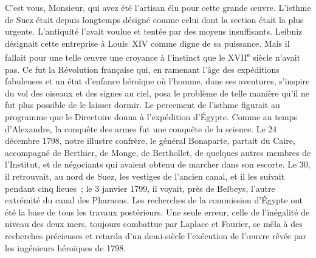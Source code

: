 \documentclass[french,twoside]{book} %
\newcommand\orgName[1]{#1}
\newcommand\persName[1]{#1}
\newcommand\placeName[1]{#1}
\begin{document}
C’est vous, Monsieur, qui avez été l’artisan élu pour cette grande œuvre. L’{\placeName isthme de Suez} était depuis longtemps désigné comme celui dont la section était la plus urgente. L’antiquité l’avait voulue et tentée par des moyens insuffisants. {\persName Leibniz} désignait cette entreprise à {\persName Louis XIV} comme digne de sa puissance. Mais il fallait pour une telle œuvre une croyance à l’instinct que le XVII\textsuperscript{e} siècle n’avait pas. Ce fut la Révolution française qui, en ramenant l’âge des expéditions fabuleuses et un état d’enfance héroïque où l’homme, dans ses aventures, s’inspire du vol des oiseaux et des signes au ciel, posa le problème de telle manière qu’il ne fut plus possible de le laisser dormir. Le percement de l’isthme figurait au programme que le {\orgName Directoire} donna à l’expédition d’{\placeName Égypte}. Comme au temps d’{\persName Alexandre}, la conquête des armes fut une conquête de la science. Le 24 décembre 1798, notre illustre confrère, le {\persName général Bonaparte}, partait du {\placeName Caire}, accompagné de {\persName Berthier}, de {\persName Monge}, de {\persName Berthollet}, de quelques autres membres de l’{\orgName Institut}, et de négociants qui avaient obtenu de marcher dans son escorte. Le 30, il retrouvait, au nord de {\placeName Suez}, les vestiges de l’ancien canal, et il les suivait pendant cinq lieues ; le 3 janvier 1799, il voyait, près de {\placeName Belbeys}, l’autre extrémité du {\placeName canal des Pharaons}. Les recherches de la {\orgName commission d’Égypte} ont été la base de tous les travaux postérieurs. Une seule erreur, celle de l’inégalité de niveau des deux mers, toujours combattue par {\persName Laplace} et {\persName Fourier}, se mêla à des recherches précieuses et retarda d’un demi-siècle l’exécution de l’œuvre rêvée par les ingénieurs héroïques de 1798.\par
\end{document}
